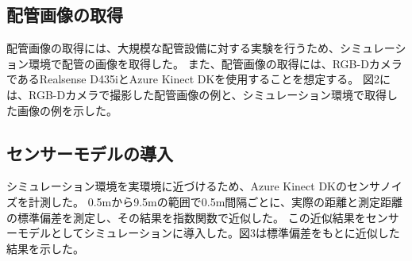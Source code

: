 \subsection{配管画像の取得}
配管画像の取得には、大規模な配管設備に対する実験を行うため、シミュレーション環境で配管の画像を取得した。
また、配管画像の取得には、RGB-DカメラであるRealsense D435iとAzure Kinect DKを使用することを想定する。
図2には、RGB-Dカメラで撮影した配管画像の例と、シミュレーション環境で取得した画像の例を示した。

\subsection{センサーモデルの導入}
シミュレーション環境を実環境に近づけるため、Azure Kinect DKのセンサノイズを計測した。
0.5mから9.5mの範囲で0.5m間隔ごとに、実際の距離と測定距離の標準偏差を測定し、その結果を指数関数で近似した。
この近似結果をセンサーモデルとしてシミュレーションに導入した。図3は標準偏差をもとに近似した結果を示した。





